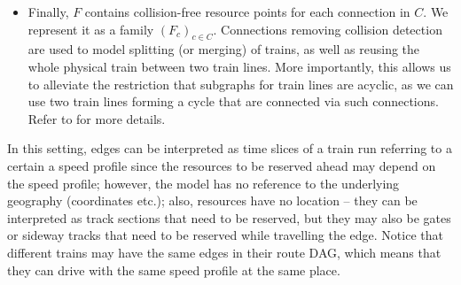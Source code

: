 \documentclass{article}
\begin{document}
\begin{itemize}
    \item Finally, $F$ contains collision-free resource points for each connection in $C$. We represent it as a family $(F_c)_{c\in C}$. Connections removing collision detection are used to model splitting (or merging) of trains, as well as reusing the whole physical train between two train lines. More importantly, this allows us to alleviate the restriction that subgraphs for train lines are acyclic, as we can use two train lines forming a cycle that are connected via such connections. Refer to \cite{DBLP:journals/corr/abs-2003-08598} for more details.
\end{itemize}
In this setting, edges can be interpreted as time slices of a train run referring to a certain a speed profile since the resources to be reserved ahead may depend on the speed profile; however, the model has no reference to the underlying geography (coordinates etc.); also, resources have no location -- they can be interpreted as track sections that need to be reserved, but they may also be gates or sideway tracks that need to be reserved while travelling the edge. Notice that different trains may have the same edges in their route DAG, which means that they can drive with the same speed profile at the same place.
\end{document}
